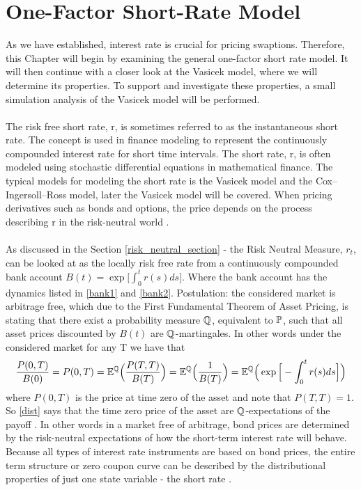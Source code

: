 \section{One-Factor Short-Rate Model}
As we have established, interest rate is crucial 
for pricing swaptions. Therefore, this Chapter will 
begin by examining the general one-factor short rate 
model. It will then continue with a closer look at the 
Vasicek model, where we will determine its properties. 
To support and investigate these properties, a small 
simulation analysis of the Vasicek model will be 
performed.
\\\\
The risk free short rate, r, is sometimes referred to as the instantaneous short rate. 
The concept is used in finance modeling to represent the continuously compounded interest rate for 
short time intervals. The short rate, r, is often modeled using stochastic differential equations in 
mathematical finance. The typical models for modeling the short rate is the Vasicek model and the Cox–Ingersoll–Ross model, 
later the Vasicek model will be covered. When pricing derivatives such as bonds and options, the price depends on 
the process describing r in the risk-neutral world \cite{Hull}.
\\\\
As discussed in the Section \ref{risk_neutral_section} - the Risk Neutral Measure, $r_t$, can be looked at as the locally risk free 
rate from a continuously compounded bank account $B(t)= \exp \Big[\int_{0}^{t} r(s) ds \Big]$. 
Where the bank account has the dynamics listed in \autoref{bank1} and \autoref{bank2}.
Postulation: the considered market is arbitrage free, which due to the First Fundamental Theorem of Asset Pricing, 
is stating that there exist a probability measure $\mathbb{Q}$, equivalent to $\mathbb{P}$, such that all asset prices discounted by $B(t)$
are $\mathbb{Q}$-martingales. In other words under the considered market for any T we have that 
\begin{align}
    \frac{P(0,T)}{B(0)} = P(0,T) = \mathbb{E}^{\mathbb{Q}} \Big( \frac{P(T,T)}{B(T)}\Big) = \mathbb{E}^{\mathbb{Q}} \Big( \frac{1}{B(T)}\Big) 
    = \mathbb{E}^{\mathbb{Q}} \Big( \exp \Big[ - \int_{0}^{t}r(s)ds \Big] \Big)
    \label{dist}
\end{align}
where $P(0,T)$ is the price at time zero of the asset and note that $P(T,T)=1$. So \autoref{dist} says that 
the time zero price of the asset are $\mathbb{Q}$-expectations  of the payoff \cite{Bermudan}.
In other words in a market free of arbitrage, bond prices are determined by the risk-neutral expectations 
of how the short-term interest rate will behave. Because all types of interest rate instruments are based
on bond prices, the entire term structure or zero coupon curve can be described by the distributional properties
of just one state variable - the short rate \cite{Bermudan}.
\newpage

